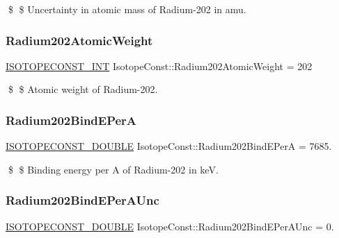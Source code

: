 \$ \$ Uncertainty in atomic mass of Radium-\/202 in amu. \mbox{\label{group___isotope_const-_radium-_ra202_ga2779785e96349d9e5590a6fb02bbcdce}} 
\subsubsection{\texorpdfstring{Radium202\+Atomic\+Weight}{Radium202AtomicWeight}}
{\footnotesize\ttfamily \mbox{\hyperlink{group___isotope_const-_macros_ga5f18360b3e99483a35c32d789e62621c}{I\+S\+O\+T\+O\+P\+E\+C\+O\+N\+S\+T\+\_\+\+I\+NT}} Isotope\+Const\+::\+Radium202\+Atomic\+Weight = 202}

\$ \$ Atomic weight of Radium-\/202. \mbox{\label{group___isotope_const-_radium-_ra202_ga916ae0f690ed16f2ca8720a6d5c7f6fa}} 
\subsubsection{\texorpdfstring{Radium202\+Bind\+E\+PerA}{Radium202BindEPerA}}
{\footnotesize\ttfamily \mbox{\hyperlink{group___isotope_const-_macros_ga8f45a7272ce02c0b4c65c44636ed719a}{I\+S\+O\+T\+O\+P\+E\+C\+O\+N\+S\+T\+\_\+\+D\+O\+U\+B\+LE}} Isotope\+Const\+::\+Radium202\+Bind\+E\+PerA = 7685.}

\$ \$ Binding energy per A of Radium-\/202 in keV. \mbox{\label{group___isotope_const-_radium-_ra202_ga80e050a1d9f234504dc1e3c64dbc4ecb}} 
\subsubsection{\texorpdfstring{Radium202\+Bind\+E\+Per\+A\+Unc}{Radium202BindEPerAUnc}}
{\footnotesize\ttfamily \mbox{\hyperlink{group___isotope_const-_macros_ga8f45a7272ce02c0b4c65c44636ed719a}{I\+S\+O\+T\+O\+P\+E\+C\+O\+N\+S\+T\+\_\+\+D\+O\+U\+B\+LE}} Isotope\+Const\+::\+Radium202\+Bind\+E\+Per\+A\+Unc = 0.}

